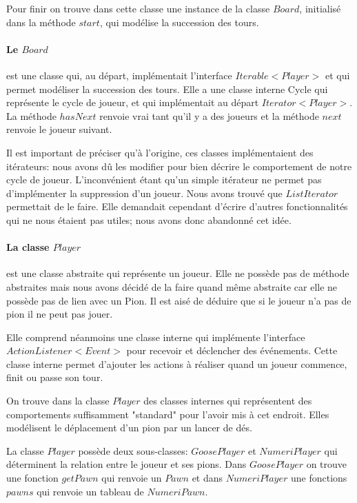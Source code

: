 \documentclass{article}
\begin{document}
Pour finir on trouve dans cette classe une instance de la classe $Board$, initialisé dans la méthode $start$, qui modélise la succession des tours.

\paragraph{Le $Board$} est une classe qui, au départ, implémentait l'interface $Iterable<Player>$ et qui permet modéliser la succession des tours. Elle a une classe interne Cycle qui représente le cycle de joueur, et qui implémentait au départ $Iterator<Player>$. La méthode $hasNext$ renvoie vrai tant qu'il y a des joueurs et la méthode $next$ renvoie le joueur suivant. 

Il est important de préciser qu'à l'origine, ces classes implémentaient des itérateurs: nous avons dû les modifier pour bien décrire le comportement de notre cycle de joueur. L'inconvénient étant qu'un simple itérateur ne permet pas d'implémenter la suppression d'un joueur. Nous avons trouvé que $ListIterator$ permettait de le faire. Elle demandait cependant d'écrire d'autres fonctionnalités qui ne nous étaient pas utiles; nous avons donc abandonné cet idée.

\paragraph{La classe $Player$} est une classe abstraite qui représente un joueur. Elle ne possède pas de méthode abstraites mais nous avons décidé de la faire quand même abstraite car elle ne possède pas de lien avec un Pion. Il est aisé de déduire que si le joueur n'a pas de pion il ne peut pas jouer.

Elle comprend néanmoins une classe interne qui implémente l'interface $ActionListener<Event>$ pour recevoir et déclencher des événements. Cette classe interne permet d'ajouter les actions à réaliser quand un joueur commence, finit ou passe son tour.

On trouve dans la classe $Player$ des classes internes qui représentent des comportements suffisamment "standard" pour l'avoir mis à cet endroit. Elles modélisent le déplacement d'un pion par un lancer de dés.

La classe $Player$ possède deux sous-classes: $GoosePlayer$ et $NumeriPlayer$ qui déterminent la relation entre le joueur et ses pions. Dans $GoosePlayer$ on trouve une fonction $getPawn$ qui renvoie un $Pawn$ et dans $NumeriPlayer$ une fonctions $pawns$ qui renvoie un tableau de $NumeriPawn$.
\end{document}
